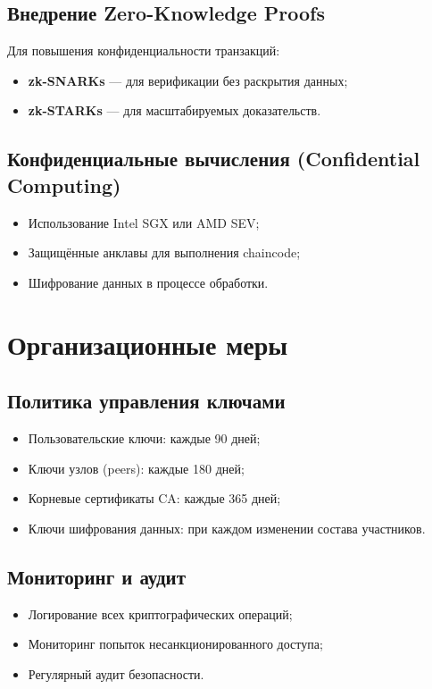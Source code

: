 \documentclass[a4paper,14pt]{extreport}
\begin{document}
\subsection{Внедрение Zero-Knowledge Proofs}

Для повышения конфиденциальности транзакций:
\begin{itemize}
    \item \textbf{zk-SNARKs} --- для верификации без раскрытия данных;
    \item \textbf{zk-STARKs} --- для масштабируемых доказательств.
\end{itemize}

\subsection{Конфиденциальные вычисления (Confidential Computing)}

\begin{itemize}
    \item Использование Intel SGX или AMD SEV;
    \item Защищённые анклавы для выполнения chaincode;
    \item Шифрование данных в процессе обработки.
\end{itemize}

\section{Организационные меры}

\subsection{Политика управления ключами}

\begin{itemize}
    \item Пользовательские ключи: каждые 90 дней;
    \item Ключи узлов (peers): каждые 180 дней;
    \item Корневые сертификаты CA: каждые 365 дней;
    \item Ключи шифрования данных: при каждом изменении состава участников.
\end{itemize}

\subsection{Мониторинг и аудит}

\begin{itemize}
    \item Логирование всех криптографических операций;
    \item Мониторинг попыток несанкционированного доступа;
    \item Регулярный аудит безопасности.
\end{itemize}
\end{document}
